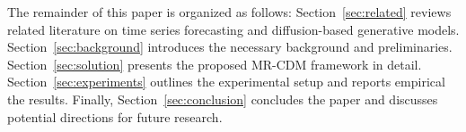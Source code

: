 The remainder of this paper is organized as follows: 
Section~\ref{sec:related} reviews related literature on time series forecasting and diffusion-based generative models. 
Section~\ref{sec:background} introduces the necessary background and preliminaries. 
Section~\ref{sec:solution} presents the proposed MR-CDM framework in detail. 
Section~\ref{sec:experiments} outlines the experimental setup and reports empirical the results. 
Finally, Section~\ref{sec:conclusion} concludes the paper and discusses potential directions for future research.







